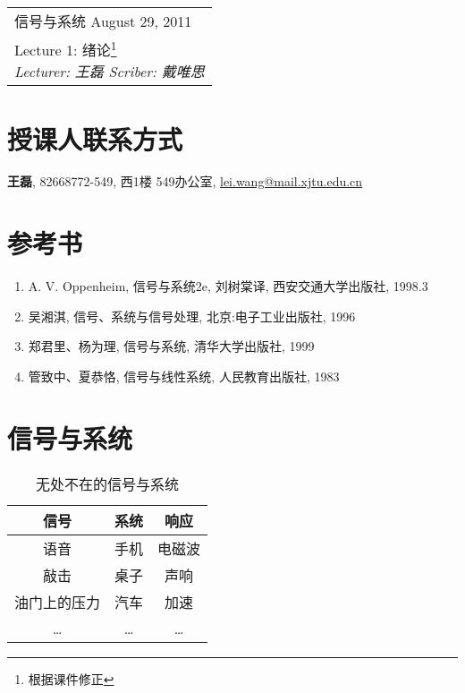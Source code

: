 \clearpage \noindent\begin{tabularx}{\linewidth}{|X|}
\hline \vskip -2mm
{\sf 信号与系统} \hfill August 29, 2011 \\
{\centering \sf \large Lecture 1:
绪论\footnote{根据课件修正}\\ }
\textit{Lecturer: 王磊 \hfill Scriber: 戴唯思}\\ \hline
\end{tabularx}
\setcounter{section}{0}
\renewcommand{\thepage}{\lecture -\arabic{page}}
\def\lecture{1}

\section{授课人联系方式}

    \textbf{王磊}, 82668772-549, 西1楼 549办公室, \url{lei.wang@mail.xjtu.edu.cn}

\section{参考书}

    \begin{enumerate}
        \item A. V. Oppenheim, 信号与系统2e, 刘树棠译, 西安交通大学出版社, 1998.3
        \item 吴湘淇, 信号、系统与信号处理, 北京:电子工业出版社, 1996
        \item 郑君里、杨为理, 信号与系统, 清华大学出版社, 1999
        \item 管致中、夏恭恪, 信号与线性系统, 人民教育出版社, 1983
    \end{enumerate}

\section{信号与系统}

    \begin{table}[h] \centering
        \caption{无处不在的信号与系统}
        \label{tab:1:signals-and-systems-everywhere}
        \begin{tabular}{ccc} \toprule
            信号 & 系统 & 响应 \\ \midrule
            语音 & 手机 & 电磁波 \\
            敲击 & 桌子 & 声响 \\
            油门上的压力 & 汽车 & 加速 \\
            \ldots & \ldots & \ldots \\
            \bottomrule
        \end{tabular}
    \end{table}

